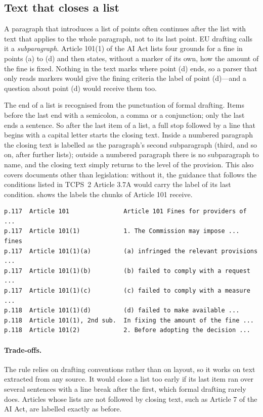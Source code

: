 \subsection{Text that closes a list}

A paragraph that introduces a list of points often continues after the list
with text that applies to the whole paragraph, not to its last point. EU
drafting calls it a \emph{subparagraph}. Article 101(1) of the AI Act lists
four grounds for a fine in points (a) to (d) and then states, without a marker
of its own, how the amount of the fine is fixed. Nothing in the text marks
where point (d) ends, so a parser that only reads markers would give the
fining criteria the label of point (d)---and a question about point (d) would
receive them too.

The end of a list is recognised from the punctuation of formal drafting. Items
before the last end with a semicolon, a comma or a conjunction; only the last
ends a sentence. So after the last item of a list, a full stop followed by a
line that begins with a capital letter starts the closing text. Inside a
numbered paragraph the closing text is labelled as the paragraph's second
subparagraph (third, and so on, after further lists); outside a numbered
paragraph there is no subparagraph to name, and the closing text simply
returns to the level of the provision. This also covers documents other than
legislation: without it, the guidance that follows the conditions listed in
TCPS~2 Article 3.7A would carry the label of its last condition.
 shows the labels the chunks of Article 101 receive.

\begin{lstlisting}[float, numbers=none, caption={Labels assigned to the chunks of
Article 101 of the AI Act.}, label={lst:article101}]
p.117  Article 101               Article 101 Fines for providers of ...
p.117  Article 101(1)            1. The Commission may impose ... fines
p.117  Article 101(1)(a)         (a) infringed the relevant provisions ...
p.117  Article 101(1)(b)         (b) failed to comply with a request ...
p.117  Article 101(1)(c)         (c) failed to comply with a measure ...
p.118  Article 101(1)(d)         (d) failed to make available ...
p.118  Article 101(1), 2nd sub.  In fixing the amount of the fine ...
p.118  Article 101(2)            2. Before adopting the decision ...
\end{lstlisting}

\paragraph{Trade-offs.} The rule relies on drafting conventions rather than
on layout, so it works on text extracted from any source. It would close a
list too early if its last item ran over several sentences with a line break
after the first, which formal drafting rarely does. Articles whose lists are
not followed by closing text, such as Article 7 of the AI Act, are labelled
exactly as before.

